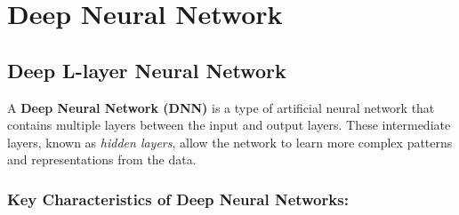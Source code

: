 \documentclass[letterpaper,12pt,notitlepage,twoside]{report}
\begin{document}
\section{Deep Neural Network}
\subsection{Deep L-layer Neural Network}
A \textbf{Deep Neural Network (DNN)} is a type of artificial neural network that contains multiple layers between the input and output layers. These intermediate layers, known as \textit{hidden layers}, allow the network to learn more complex patterns and representations from the data.

\subsubsection{Key Characteristics of Deep Neural Networks:}
\end{document}
